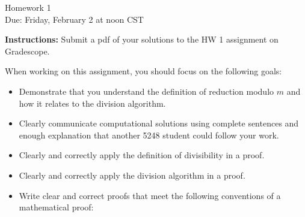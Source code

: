 \documentclass[12pt]{article}
\begin{document}
\begin{center}
{\Large Homework 1}\\
Due: Friday,  February 2 at noon CST\\


\end{center}
{\bf Instructions:} Submit a pdf of your solutions to the HW 1 assignment on Gradescope. 

When working on this assignment, you should focus on the following goals:
\begin{itemize}
\item Demonstrate that you understand the definition of reduction modulo $m$ and how it relates to the division algorithm. 
\item Clearly communicate computational solutions using complete sentences and enough explanation that another 5248 student could follow your work.
\item Clearly and correctly apply the definition of divisibility in a proof. 
\item Clearly and correctly apply the division algorithm in a proof.
\item Write clear and correct proofs that meet the following conventions of a mathematical proof:
\end{itemize}
\end{document}
